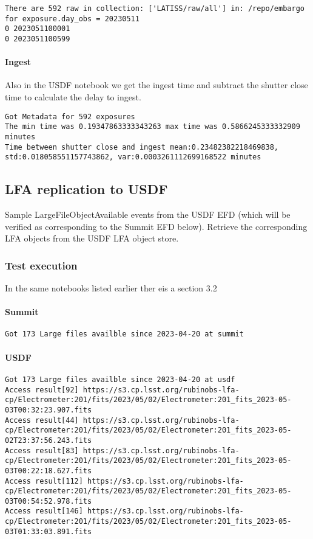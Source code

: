 \begin{verbatim}
There are 592 raw in collection: ['LATISS/raw/all'] in: /repo/embargo for exposure.day_obs = 20230511
0 2023051100001
0 2023051100599
\end{verbatim}

\paragraph {Ingest}
Also in the USDF notebook we get the ingest time and subtract the shutter close time to calculate the
delay to ingest.
\begin{verbatim}
Got Metadata for 592 exposures
The min time was 0.19347863333343263 max time was 0.5866245333332909 minutes
Time between shutter close and ingest mean:0.23482382218469838, std:0.018058551157743862, var:0.0003261112699168522 minutes
\end{verbatim}

\subsection{LFA replication to USDF }
Sample LargeFileObjectAvailable events from the USDF EFD (which will be verified as corresponding to the Summit EFD below).
Retrieve the corresponding LFA objects from the USDF LFA object store.
\subsubsection{Test execution}
In the same notebooks  listed earlier ther eis a section 3.2
\paragraph{Summit}
\begin{verbatim}
Got 173 Large files availble since 2023-04-20 at summit
\end{verbatim}

\paragraph{USDF}
\begin{verbatim}
Got 173 Large files availble since 2023-04-20 at usdf
Access result[92] https://s3.cp.lsst.org/rubinobs-lfa-cp/Electrometer:201/fits/2023/05/02/Electrometer:201_fits_2023-05-03T00:32:23.907.fits
Access result[44] https://s3.cp.lsst.org/rubinobs-lfa-cp/Electrometer:201/fits/2023/05/02/Electrometer:201_fits_2023-05-02T23:37:56.243.fits
Access result[83] https://s3.cp.lsst.org/rubinobs-lfa-cp/Electrometer:201/fits/2023/05/02/Electrometer:201_fits_2023-05-03T00:22:18.627.fits
Access result[112] https://s3.cp.lsst.org/rubinobs-lfa-cp/Electrometer:201/fits/2023/05/02/Electrometer:201_fits_2023-05-03T00:54:52.978.fits
Access result[146] https://s3.cp.lsst.org/rubinobs-lfa-cp/Electrometer:201/fits/2023/05/02/Electrometer:201_fits_2023-05-03T01:33:03.891.fits
\end{verbatim}


